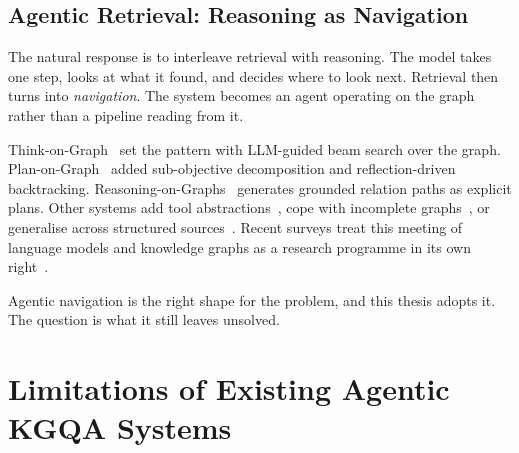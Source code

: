 \subsection{Agentic Retrieval: Reasoning as Navigation}

The natural response is to interleave retrieval with reasoning. The model takes
one step, looks at what it found, and decides where to look next. Retrieval then
turns into \emph{navigation}. The system becomes an agent operating on the graph
rather than a pipeline reading from it.

Think-on-Graph~\cite{sun2024think} set the pattern with LLM-guided beam search
over the graph. Plan-on-Graph~\cite{chen2024plan} added sub-objective
decomposition and reflection-driven backtracking.
Reasoning-on-Graphs~\cite{luo2024reasoning} generates grounded relation paths as
explicit plans. Other systems add tool abstractions~\cite{jiang2024kgagent},
cope with incomplete graphs~\cite{xu2024generate}, or generalise across
structured sources~\cite{jiang2023structgpt}. Recent surveys treat this meeting
of language models and knowledge graphs as a research programme in its own
right~\cite{pan2024unifying,ma2025unifying}.

Agentic navigation is the right shape for the problem, and this thesis adopts
it. The question is what it still leaves unsolved.

\section{Limitations of Existing Agentic KGQA Systems}\label{sec:limitations}

